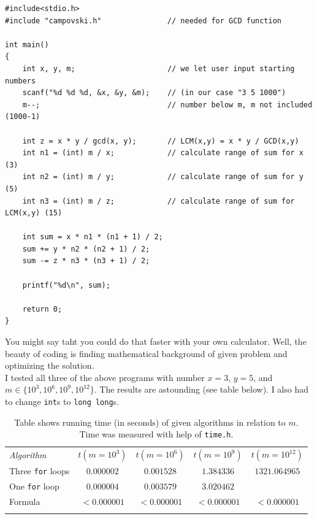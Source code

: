 \documentclass{book}
\begin{document}
\begin{verbatim}
#include<stdio.h>
#include "campovski.h"               // needed for GCD function

int main()
{
    int x, y, m;                     // we let user input starting numbers
    scanf("%d %d %d, &x, &y, &m);    // (in our case "3 5 1000")
    m--;                             // number below m, m not included (1000-1)
    
    int z = x * y / gcd(x, y);       // LCM(x,y) = x * y / GCD(x,y)
    int n1 = (int) m / x;            // calculate range of sum for x (3)
    int n2 = (int) m / y;            // calculate range of sum for y (5)
    int n3 = (int) m / z;            // calculate range of sum for LCM(x,y) (15)
    
    int sum = x * n1 * (n1 + 1) / 2;
    sum += y * n2 * (n2 + 1) / 2;
    sum -= z * n3 * (n3 + 1) / 2;
    
    printf("%d\n", sum);
    
    return 0; 
}
\end{verbatim}

You might say taht you could do that faster with your own calculator. Well, the beauty of coding is finding mathematical background of given problem and optimizing the solution.\\

I tested all three of the above programs with number $x = 3$, $y = 5$, and $m \in \{10^3, 10^6, 10^9, 10^{12}\}$. The results are astounding (see table below). I also had to change \texttt{int}s to \texttt{long long}s.

\begin{table}[h!]
\centering
\begin{tabular}{||l||c|c|c|c||}
\hhline{|t:=====:t|}
\textit{Algorithm} & $t(m = 10^3)$ & $t(m = 10^6)$ & $t(m=10^9)$ & $t(m=10^{12})$\\
\hhline{||=||=|=|=|=||}
Three \texttt{for} loops & $0.000002$ & $0.001528$ & $1.384336$ & $1321.064965$\\
\hhline{||-||-|-|-|-||}
One \texttt{for} loop & $0.000004$ & $0.003579$ & $3.020462$ & \\
\hhline{||-||-|-|-|-||}
Formula & $< 0.000001$ & $< 0.000001$ & $< 0.000001$ & $< 0.000001$\\
\hhline{|b:=====:b|}
\end{tabular}
\caption{Table shows running time (in seconds) of given algorithms in relation to $m$. Time was measured with help of \texttt{time.h}.}
\end{table}
\end{document}
